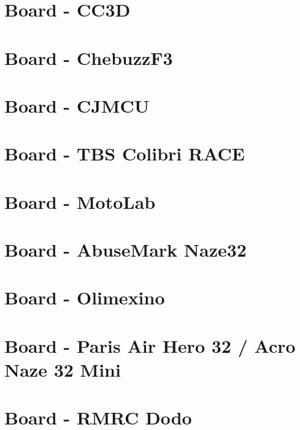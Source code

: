 \documentclass[twoside]{book}
\newcommand{\+}{\discretionary{\mbox{\scriptsize$\hookleftarrow$}}{}{}}
\begin{document}
\chapter{Board -\/ C\+C3\+D}
\label{md_docs_Board_-_CC3D}
\hypertarget{md_docs_Board_-_CC3D}{}

\chapter{Board -\/ Chebuzz\+F3}
\label{md_docs_Board_-_ChebuzzF3}
\hypertarget{md_docs_Board_-_ChebuzzF3}{}

\chapter{Board -\/ C\+J\+M\+C\+U}
\label{md_docs_Board_-_CJMCU}
\hypertarget{md_docs_Board_-_CJMCU}{}

\chapter{Board -\/ T\+B\+S Colibri R\+A\+C\+E}
\label{md_docs_Board_-_ColibriRace}
\hypertarget{md_docs_Board_-_ColibriRace}{}

\chapter{Board -\/ Moto\+Lab}
\label{md_docs_Board_-_MotoLab}
\hypertarget{md_docs_Board_-_MotoLab}{}

\chapter{Board -\/ Abuse\+Mark Naze32}
\label{md_docs_Board_-_Naze32}
\hypertarget{md_docs_Board_-_Naze32}{}

\chapter{Board -\/ Olimexino}
\label{md_docs_Board_-_Olimexino}
\hypertarget{md_docs_Board_-_Olimexino}{}

\chapter{Board -\/ Paris Air Hero 32 / Acro Naze 32 Mini}
\label{md_docs_Board_-_Paris_Air_Hero_32}
\hypertarget{md_docs_Board_-_Paris_Air_Hero_32}{}

\chapter{Board -\/ R\+M\+R\+C Dodo}
\label{md_docs_Board_-_RMDO}
\hypertarget{md_docs_Board_-_RMDO}{}

\end{document}
